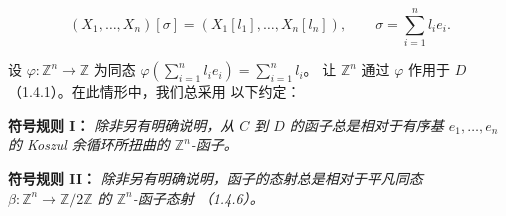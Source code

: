 \begin{equation}
  (X_1,\ldots,X_n)[\sigma]
  =(X_1[l_1],\ldots,X_n[l_n]),
  \qquad
  \sigma=\sum_{i=1}^{n}l_i e_i.
  \tag{1.6.6.1}
\end{equation}

设 $\varphi\colon\mathbb Z^n\to\mathbb Z$ 为同态
$\varphi(\sum_{i=1}^{n}l_i e_i)=\sum_{i=1}^{n}l_i$。
让 $\mathbb Z^n$ 通过 $\varphi$ 作用于 $D$（1.4.1）。在此情形中，我们总采用
以下约定：

\noindent\textbf{符号规则 I：}
\emph{除非另有明确说明，从 $C$ 到 $D$ 的函子总是相对于有序基
$e_1,\ldots,e_n$ 的 Koszul 余循环所扭曲的 $\mathbb Z^n$-函子。}

\noindent\textbf{符号规则 II：}
\emph{除非另有明确说明，函子的态射总是相对于平凡同态
$\beta\colon\mathbb Z^n\to\mathbb Z/2\mathbb Z$ 的 $\mathbb Z^n$-函子态射
（1.4.6）。}

